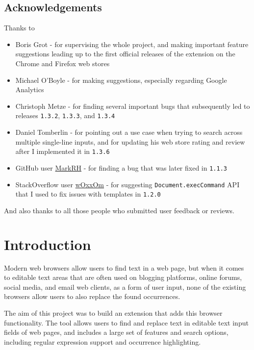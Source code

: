 \documentclass[bsc,frontabs,twoside,singlespacing,parskip,deptreport]{infthesis}
\begin{document}
\section*{Acknowledgements}
Thanks to
\begin{itemize}
\item
  Boris Grot - for supervising the whole project, and making important feature suggestions leading up to the first official releases of the extension on the Chrome and Firefox web stores
\item
  Michael O'Boyle - for making suggestions, especially regarding Google Analytics
\item
  Christoph Metze - for finding several important bugs that subsequently led to releases \texttt{1.3.2}, \texttt{1.3.3}, and \texttt{1.3.4}
\item
  Daniel Tomberlin - for pointing out a use case when trying to search across multiple single-line inputs, and for updating his web store rating and review after I implemented it in \texttt{1.3.6}
\item
  GitHub user \href{https://github.com/MarkRH}{MarkRH} - for finding a bug that was later fixed in \texttt{1.1.3}
\item
  StackOverflow user \href{https://stackoverflow.com/users/3959875/woxxom}{wOxxOm} - for suggesting \texttt{Document.execCommand} API that I used to fix issues with templates in \texttt{1.2.0}
\end{itemize}

And also thanks to all those people who submitted user feedback or
reviews.

\standarddeclaration

\tableofcontents
\listoffigures

\chapter{Introduction} %
Modern web browsers allow users to find text in a web page, but when it comes to editable text areas that are often used on blogging platforms, online forums, social media, and email web clients, as a form of user input, none of the existing browsers allow users to also replace the found occurrences.
 
The aim of this project was to build an extension that adds this browser functionality. The tool allows users to find and replace text in editable text input fields of web pages, and includes a large set of features and search options, including regular expression support and occurrence highlighting.
\end{document}
